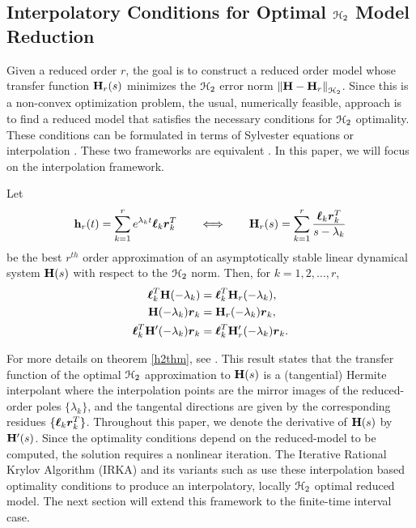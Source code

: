\documentclass[twocolumn]{autart}
\begin{document}
\subsection{Interpolatory Conditions for Optimal $\EuScript{H}_2$ Model Reduction}
Given a reduced order $r$, the goal is to construct a reduced order model whose transfer function $\mathbf{H}_r(s)$ minimizes the $\EuScript{H}_2$ error norm $\left\lVert\mathbf{H} - \mathbf{H}_r\right\rVert_{\EuScript{H}_2}$.  Since this is a non-convex optimization problem, the usual, numerically feasible, approach  is to find a reduced model that satisfies the necessary conditions for $\EuScript{H}_2$ optimality. These conditions can be formulated in terms of Sylvester equations \cite{Wil70,HylB85} or interpolation \cite{MeiL67,GugBA08}. These two frameworks are equivalent \cite{GugBA08}. In this paper, we will focus on the interpolation framework.
\begin{theorem} \label{h2thm}%
Let 
$$
\mathbf{h}_r(t)=\sum_{k=1}^r e^{\lambda_kt}\boldsymbol{\ell}_k\boldsymbol{r}_k^T \qquad \Longleftrightarrow \qquad \mathbf{H}_r(s) = \sum_{k=1}^r \frac{\boldsymbol{\ell}_k\boldsymbol{r}_k^T}{s-\lambda_k}
$$
be the best $r^{th}$ order approximation of an asymptotically stable linear dynamical system  $\mathbf{H}(s)$ with respect to the $\EuScript{H}_2$ norm. Then, for $k=1, 2, ... , r$,
\begin{equation} \label{eqn:h2cond}
\begin{aligned}
\boldsymbol{\ell}_k^T\mathbf{H}(-\lambda_k)&=\boldsymbol{\ell}_k^T\mathbf{H}_r(-\lambda_k),\\~~
\mathbf{H}(-\lambda_k)\boldsymbol{r}_k&=\mathbf{H}_r(-\lambda_k)\boldsymbol{r}_k,\\
\boldsymbol{\ell}_k^T\mathbf{H}'(-\lambda_k)\boldsymbol{r}_k&=\boldsymbol{\ell}_k^T\mathbf{H}_r'(-\lambda_k)\boldsymbol{r}_k.
\end{aligned}
\end{equation}
\end{theorem}
{\color{red}For more details on theorem \ref{h2thm}, see {\cite {GugBA08}}.}
This result states that the transfer function of the optimal $\EuScript{H}_2$ approximation to $\mathbf{H}(s)$ is a (tangential) Hermite interpolant where the interpolation points are the mirror images of the reduced-order poles $\{\lambda_k\}$, and the tangental directions are given by the corresponding residues $\{\boldsymbol{\ell}_k\boldsymbol{r}_k^T\}$. {\color{red} Throughout this paper, we denote the derivative of $\mathbf{H}(s)$ by $\mathbf{H}'(s)$.} Since the optimality conditions depend on the reduced-model to be computed, the solution requires a nonlinear iteration. The Iterative Rational Krylov Algorithm (IRKA)  \cite{GugBA08} and its variants such as \cite{beattie2012realization,gerstner2007hom,CasL18,beattie2009trust} use these interpolation based optimality conditions to produce   an interpolatory, locally $\EuScript{H}_2$ optimal reduced model. The next section will extend this framework to the finite-time interval case.
\end{document}
